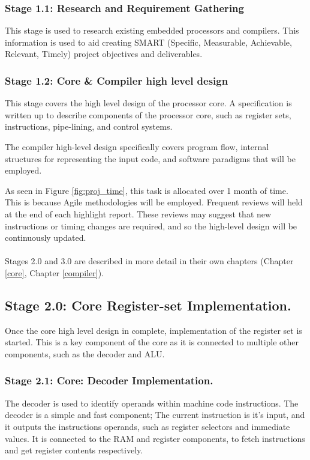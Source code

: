 \documentclass[11pt,a4paper]{report}
\begin{document}
\subsubsection*{Stage 1.1: Research and Requirement Gathering}
This stage is used to research existing embedded processors and compilers. This information is used to aid creating SMART (Specific, Measurable, Achievable, Relevant, Timely) project objectives and deliverables.

\subsubsection*{Stage 1.2: Core \& Compiler high level design}
This stage covers the high level design of the processor core. A specification is written up to describe components of the processor core, such as register sets, instructions, pipe-lining, and control systems.

The compiler high-level design specifically covers program flow, internal structures for representing the input code, and software paradigms that will be employed.

As seen in Figure \ref{fig:proj_time}, this task is allocated over 1 month of time. This is because Agile methodologies will be employed. Frequent reviews will held at the end of each highlight report. These reviews may suggest that new instructions or timing changes are required, and so the high-level design will be continuously updated.
\\\\
Stages 2.0 and 3.0 are described in more detail in their own chapters (Chapter \ref{core}, Chapter \ref{compiler}). 

\subsection*{Stage 2.0: Core Register-set Implementation.}
Once the core high level design in complete, implementation of the register set is started. This is a key component of the core as it is connected to multiple other components, such as the decoder and ALU.

\subsubsection*{Stage 2.1: Core: Decoder Implementation.}
The decoder is used to identify operands within machine code instructions. The decoder is a simple and fast component; The current instruction is it's input, and it outputs the instructions operands, such as register selectors and immediate values. It is connected to the RAM and register components, to fetch instructions and get register contents respectively.
\end{document}
